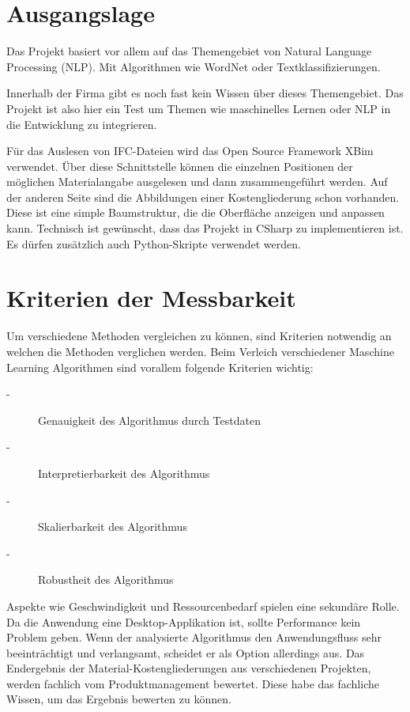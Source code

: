 \begin{onehalfspace}
\section{Ausgangslage}

Das Projekt basiert vor allem auf das Themengebiet von Natural Language Processing (NLP). Mit Algorithmen wie WordNet oder Textklassifizierungen.

Innerhalb der Firma gibt es noch fast kein Wissen über dieses Themengebiet. Das Projekt ist also hier ein Test um Themen wie maschinelles Lernen oder NLP in die Entwicklung zu integrieren.

Für das Auslesen von IFC-Dateien wird das Open Source Framework XBim verwendet. Über diese Schnittstelle können die einzelnen Positionen der möglichen Materialangabe ausgelesen und dann zusammengeführt werden. Auf der anderen Seite sind die Abbildungen einer Kostengliederung schon vorhanden. Diese ist eine simple Baumstruktur, die die Oberfläche anzeigen und anpassen kann.
Technisch ist gewünscht, dass das Projekt in CSharp zu implementieren ist. Es dürfen zusätzlich auch Python-Skripte verwendet werden.

\section{Kriterien der Messbarkeit}

Um verschiedene Methoden vergleichen zu können, sind Kriterien notwendig an welchen die Methoden verglichen werden. Beim Verleich verschiedener Maschine Learning Algorithmen sind vorallem folgende Kriterien wichtig:
\begin{description}
	\item[-] Genauigkeit des Algorithmus durch Testdaten
	\item[-] Interpretierbarkeit des Algorithmus
	\item[-] Skalierbarkeit des Algorithmus
	\item[-] Robustheit des Algorithmus \cite{mic-ml-comparison}
\end{description}


Aspekte wie Geschwindigkeit und Ressourcenbedarf spielen eine sekundäre Rolle. Da die Anwendung eine Desktop-Applikation ist, sollte Performance kein Problem geben. Wenn der analysierte Algorithmus den Anwendungsfluss sehr beeinträchtigt und verlangsamt, scheidet er als Option allerdings aus.
Das Endergebnis der Material-Kostengliederungen aus verschiedenen Projekten, werden fachlich vom Produktmanagement bewertet. Diese habe das fachliche Wissen, um das Ergebnis bewerten zu können.


\end{onehalfspace}
